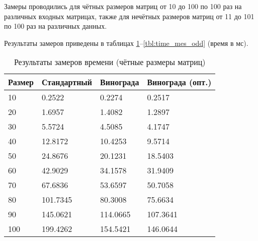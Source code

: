 Замеры проводились для чётных размеров матриц от 10 до 100 по 100 раз на различных входных матрицах,  также  для нечётных размеров матриц от 11 до 101 по 100 раз на различных данных.

Результаты замеров приведены в таблицах \ref{tbl:time_mes_even}--\ref{tbl:time_mes_odd} (время в мс).

\begin{table}[h]
    \begin{center}
        \begin{threeparttable}
        \captionsetup{justification=raggedright,singlelinecheck=off}
        \caption{Результаты замеров времени (чётные размеры матриц)}
        \label{tbl:time_mes_even}
        \begin{tabular}{|l|l|l|l|}
            \hline
            Размер & Стандартный & Винограда & Винограда (опт.) \\
            \hline
            10 & 0.2522 & 0.2274 & 0.2517 \\
            \hline
            20 & 1.6957 & 1.4082 & 1.2897 \\
            \hline
            30 & 5.5724 & 4.5085 & 4.1747 \\
            \hline
            40 & 12.8172 & 10.4253 & 9.5714 \\
            \hline
            50 & 24.8676 & 20.1231 & 18.5403 \\
            \hline
            60 & 42.9029 & 34.1578 & 31.9409 \\
            \hline
            70 & 67.6836 & 53.6597 & 50.7058 \\
            \hline
            80 & 101.7345 & 80.3008 & 75.6634 \\
            \hline
            90 & 145.0621 & 114.0665 & 107.3641 \\
            \hline
            100 & 199.4262 & 154.5421 & 146.0644 \\
            \hline
		\end{tabular}
    \end{threeparttable}
\end{center}
\end{table}

\clearpage


